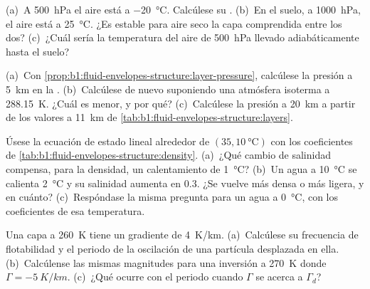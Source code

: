 \begin{exercise}[$\star\star$]\label{exo:b1:fluid-envelopes-structure:5}
(a)~A \qty{500}{hPa} el aire está a \qty{-20}{\celsius}. Calcúlese su . (b)~En el suelo, a \qty{1000}{hPa}, el aire está a
\qty{25}{\celsius}. ¿Es estable para aire seco la capa comprendida entre los dos? (c)~¿Cuál sería la temperatura del aire de \qty{500}{hPa} llevado adiabáticamente hasta el suelo?
\end{exercise}

\begin{exercise}[$\star\star$]\label{exo:b1:fluid-envelopes-structure:6}
(a)~Con \cref{prop:b1:fluid-envelopes-structure:layer-pressure}, calcúlese la presión a \qty{5}{km} en la . (b)~Calcúlese de nuevo suponiendo una atmósfera isoterma a \qty{288.15}{K}. ¿Cuál es menor, y por qué? (c)~Calcúlese la presión a \qty{20}{km} a partir de los valores a \qty{11}{km} de
\cref{tab:b1:fluid-envelopes-structure:layers}.
\end{exercise}

\begin{exercise}[$\star\star$]\label{exo:b1:fluid-envelopes-structure:7}
Úsese la ecuación de estado lineal alrededor de $(35, \qty{10}{\celsius})$ con los
coeficientes de \cref{tab:b1:fluid-envelopes-structure:density}. (a)~¿Qué cambio de salinidad compensa, para la densidad, un calentamiento de \qty{1}{\celsius}?
(b)~Un agua a \qty{10}{\celsius} se calienta \qty{2}{\celsius} y su salinidad aumenta en \num{0.3}. ¿Se vuelve más densa o más ligera, y en cuánto? (c)~Respóndase la misma pregunta para un agua a \qty{0}{\celsius}, con los coeficientes de esa temperatura.
\end{exercise}

\begin{exercise}[$\star\star$]\label{exo:b1:fluid-envelopes-structure:8}
Una capa a \qty{260}{K} tiene un gradiente de \qty{4}{K/km}. (a)~Calcúlese su frecuencia de flotabilidad y el periodo de la oscilación de una partícula desplazada
en ella. (b)~Calcúlense las mismas magnitudes para una inversión a \qty{270}{K} donde $\Gamma = \qty{-5}{K/km}$. (c)~¿Qué ocurre con el periodo cuando $\Gamma$ se acerca a $\Gamma_d$?
\end{exercise}

